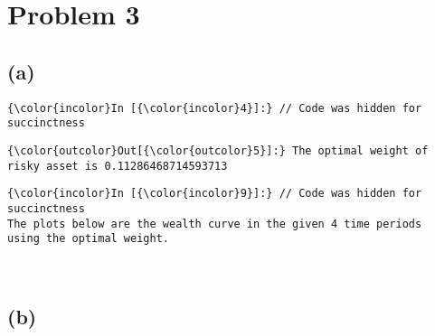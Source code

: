 \documentclass[11pt]{article}
\begin{document}
    \section{Problem 3}\label{problem-3}

    \subsection{(a)}\label{a}

    \begin{Verbatim}[commandchars=\\\{\}]
{\color{incolor}In [{\color{incolor}4}]:} // Code was hidden for succinctness
\end{Verbatim}
        
            \begin{Verbatim}[commandchars=\\\{\}]
{\color{outcolor}Out[{\color{outcolor}5}]:} The optimal weight of risky asset is 0.11286468714593713
\end{Verbatim}
        
    \begin{Verbatim}[commandchars=\\\{\}]
{\color{incolor}In [{\color{incolor}9}]:} // Code was hidden for succinctness
The plots below are the wealth curve in the given 4 time periods 
using the optimal weight.
\end{Verbatim}

    \begin{center}
    \end{center}
    { \hspace*{\fill} \\}
    
    \subsection{(b)}\label{b}
\end{document}
